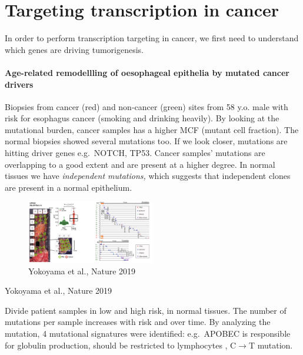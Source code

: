 \graphicspath{{chapters/_resources/}}

\chapter{Targeting transcription in cancer}
In order to perform transcription targeting in cancer, we first need to understand which genes are driving tumorigenesis.

\hypertarget{age-related-remodellling-of-oesophageal-epithelia-by-mutated-cancer-drivers}{%
\subsubsection{\texorpdfstring{Age-related remodellling of \textbf{oesophageal epithelia by mutated cancer drivers}}{Age-related remodellling of oesophageal epithelia by mutated cancer drivers}}\label{age-related-remodellling-of-oesophageal-epithelia-by-mutated-cancer-drivers}}

Biopsies from cancer (red) and non-cancer (green) sites from 58 y.o. male with risk for esophagus cancer (smoking and drinking heavily). By looking at the mutational burden, cancer samples has a higher MCF (mutant cell fraction). The normal biopsies showed several mutations too. If we look closer, mutations are hitting driver genes e.g.~NOTCH, TP53. Cancer samples' mutations are overlapping to a good extent and are present at a higher degree. In normal tissues we have \emph{independent mutations,} which suggests that independent clones are present in a normal epithelium.

\begin{figure}
\centering
\includegraphics[width=0.5\textwidth]{../_resources/Screen_Shot_2022-11-04_at_10-50-01.png}
\caption{Yokoyama et al., Nature 2019}
\end{figure}

Yokoyama et al., Nature 2019

Divide patient samples in low and high risk, in normal tissues. The number of mutations per sample increases with risk and over time. By analyzing the mutation, 4 mutational signatures were identified: e.g.~APOBEC is responsible for globulin production, should be restricted to lymphocytes , C$\rightarrow$T mutation.

